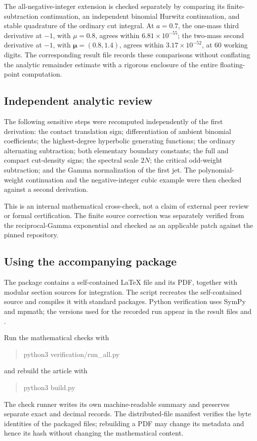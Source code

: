 The all-negative-integer extension is checked separately by comparing
its finite-subtraction continuation, an independent binomial Hurwitz
continuation, and stable quadrature of the ordinary cut integral.
At \(a=0.7\), the one-mass third derivative at \(-1\), with
\(\mu=0.8\), agrees within \(6.81\times10^{-55}\); the two-mass
second derivative at \(-1\), with \(\boldsymbol\mu=(0.8,1.4)\),
agrees within \(3.17\times10^{-52}\), at 60 working digits.
The corresponding result file records these comparisons without
conflating the analytic remainder estimate with a rigorous enclosure
of the entire floating-point computation.

\subsection{Independent analytic review}

The following sensitive steps were recomputed independently of the first
derivation: the contact translation sign; differentiation of ambient
binomial coefficients; the highest-degree hyperbolic generating functions;
the ordinary alternating subtraction; both elementary boundary constants;
the full and compact cut-density signs; the spectral scale \(2N\); the
critical odd-weight subtraction; and the Gamma normalization of the first
jet. The polynomial-weight continuation and the negative-integer cubic
example were then checked against a second derivation.

This is an internal mathematical cross-check, not a claim of external peer
review or formal certification. The finite source correction was separately
verified from the reciprocal-Gamma exponential and checked as an applicable
patch against the pinned repository.

\subsection{Using the accompanying package}

The package contains a self-contained \LaTeX{} file and its PDF, together
with modular section sources for integration. The  script
recreates the self-contained source and compiles it with standard
 packages. Python verification uses SymPy and mpmath; the
versions used for the recorded run appear in the result files and
.

Run the mathematical checks with
\begin{quote}\ttfamily
 python3 verification/run\_all.py
\end{quote}
and rebuild the article with
\begin{quote}\ttfamily
 python3 build.py
\end{quote}
The check runner writes its own machine-readable summary and preserves
separate exact and decimal records. The distributed-file manifest verifies
the byte identities of the packaged files; rebuilding a PDF may change
its metadata and hence its hash without changing the mathematical content.

